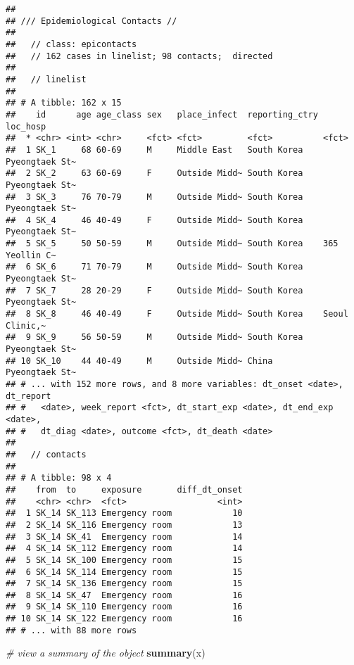 \documentclass[9pt,a4paper,]{extarticle}
\newenvironment{Shaded}{\begin{snugshade}}{\end{snugshade}}
\newcommand{\KeywordTok}[1]{\textcolor[rgb]{0.13,0.29,0.53}{\textbf{#1}}}
\newcommand{\CommentTok}[1]{\textcolor[rgb]{0.56,0.35,0.01}{\textit{#1}}}
\newcommand{\NormalTok}[1]{#1}
\theoremstyle{definition}
\theoremstyle{definition}
\theoremstyle{definition}
\theoremstyle{remark}
\begin{document}
\begin{verbatim}
## 
## /// Epidemiological Contacts //
## 
##   // class: epicontacts
##   // 162 cases in linelist; 98 contacts;  directed 
## 
##   // linelist
## 
## # A tibble: 162 x 15
##    id      age age_class sex   place_infect  reporting_ctry loc_hosp      
##  * <chr> <int> <chr>     <fct> <fct>         <fct>          <fct>         
##  1 SK_1     68 60-69     M     Middle East   South Korea    Pyeongtaek St~
##  2 SK_2     63 60-69     F     Outside Midd~ South Korea    Pyeongtaek St~
##  3 SK_3     76 70-79     M     Outside Midd~ South Korea    Pyeongtaek St~
##  4 SK_4     46 40-49     F     Outside Midd~ South Korea    Pyeongtaek St~
##  5 SK_5     50 50-59     M     Outside Midd~ South Korea    365 Yeollin C~
##  6 SK_6     71 70-79     M     Outside Midd~ South Korea    Pyeongtaek St~
##  7 SK_7     28 20-29     F     Outside Midd~ South Korea    Pyeongtaek St~
##  8 SK_8     46 40-49     F     Outside Midd~ South Korea    Seoul Clinic,~
##  9 SK_9     56 50-59     M     Outside Midd~ South Korea    Pyeongtaek St~
## 10 SK_10    44 40-49     M     Outside Midd~ China          Pyeongtaek St~
## # ... with 152 more rows, and 8 more variables: dt_onset <date>, dt_report
## #   <date>, week_report <fct>, dt_start_exp <date>, dt_end_exp <date>,
## #   dt_diag <date>, outcome <fct>, dt_death <date>
## 
##   // contacts
## 
## # A tibble: 98 x 4
##    from  to     exposure       diff_dt_onset
##    <chr> <chr>  <fct>                  <int>
##  1 SK_14 SK_113 Emergency room            10
##  2 SK_14 SK_116 Emergency room            13
##  3 SK_14 SK_41  Emergency room            14
##  4 SK_14 SK_112 Emergency room            14
##  5 SK_14 SK_100 Emergency room            15
##  6 SK_14 SK_114 Emergency room            15
##  7 SK_14 SK_136 Emergency room            15
##  8 SK_14 SK_47  Emergency room            16
##  9 SK_14 SK_110 Emergency room            16
## 10 SK_14 SK_122 Emergency room            16
## # ... with 88 more rows
\end{verbatim}

\begin{Shaded}
\begin{Highlighting}[]
\CommentTok{# view a summary of the object                  }
\KeywordTok{summary}\NormalTok{(x)}
\end{Highlighting}
\end{Shaded}
\end{document}
